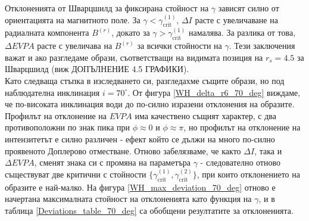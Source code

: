 Отклоненията от Шварцшилд за фиксирана стойност на $\gamma$ зависят силно от ориентацията на магнитното поле. За $\gamma < \gamma_\text{crit}^{(1)}$, $\Delta I$ расте с увеличаване на радиалната компонента $B^{(r)}$, докато за $\gamma > \gamma_\text{crit}^{(1)}$ намалява. За разлика от това, $\Delta EVPA$ расте с увеличава на $B^{(r)}$ за всички стойности на $\gamma$. Тези заключения важат и ако разгледаме образи, съответстващи на видимата позиция на $r_s = 4.5$ за Шварцшилд (виж ДОПЪЛНЕНИЕ 4.5 ГРАФИКИ).\\

Като следваща стъпка в изследването си, разгледахме същите образи, но под наблюдателна инклинация $i = 70^\circ$. От фигура \ref{WH_delta_r6_70_deg} виждаме, че по-високата инклинация води до по-силно изразени отклонения на образите. Профилът на отклонение на $EVPA$ има качествено същият характер, с два противоположни по знак пика при $\phi \approx 0$ и $\phi \approx \pi$, но профилът на отклонение на интензитетът е силно различен - ефект който се дължи на много по-силно проявеното Доплерово отместване. Отново забелязваме, че както $\Delta I$, така и $\Delta EVPA$, сменят знака си с промяна на параметъра $\gamma$ - следователно отново съществуват две критични с стойности $\{\gamma_\text{crit}^{(1)}, \gamma_\text{crit}^{(2)}\}$, при които отклонението на образите е най-малко. На фигура \ref{WH_max_deviation_70_deg} отново е начертана максималната стойност на отклоненията като функция на $\gamma$, и в таблица \ref{Deviations_table_70_deg} са обобщени резултатите за отклоненията. \newpage

